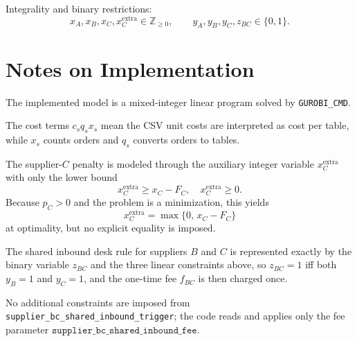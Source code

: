 Integrality and binary restrictions:
\[
x_A,x_B,x_C,x_C^{\text{extra}} \in \mathbb{Z}_{\ge 0},
\qquad
y_A,y_B,y_C,z_{BC}\in\{0,1\}.
\]

\section*{Notes on Implementation}

The implemented model is a mixed-integer linear program solved by \texttt{GUROBI\_CMD}.

The cost terms \(c_s q_s x_s\) mean the CSV unit costs are interpreted as cost per table, while \(x_s\) counts orders and \(q_s\) converts orders to tables.

The supplier-\(C\) penalty is modeled through the auxiliary integer variable \(x_C^{\text{extra}}\) with only the lower bound
\[
x_C^{\text{extra}} \ge x_C - F_C,\quad x_C^{\text{extra}} \ge 0.
\]
Because \(p_C>0\) and the problem is a minimization, this yields
\[
x_C^{\text{extra}} = \max\{0,\,x_C-F_C\}
\]
at optimality, but no explicit equality is imposed.

The shared inbound desk rule for suppliers \(B\) and \(C\) is represented exactly by the binary variable \(z_{BC}\) and the three linear constraints above, so \(z_{BC}=1\) iff both \(y_B=1\) and \(y_C=1\), and the one-time fee \(f_{BC}\) is then charged once.

No additional constraints are imposed from \texttt{supplier\_bc\_shared\_inbound\_trigger}; the code reads and applies only the fee parameter \(\texttt{supplier\_bc\_shared\_inbound\_fee}\).
